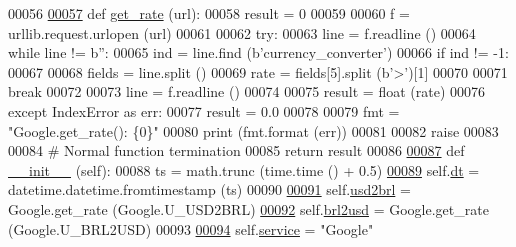 \begin{DoxyCode}
{{00056 
\hypertarget{rates_8py_source.tex_l00057}{}\hyperlink{classrates_1_1_google_afa49252959b89741449dca773f2141b8}{00057}     \textcolor{keyword}{def }\hyperlink{classrates_1_1_google_afa49252959b89741449dca773f2141b8}{get\_rate} (url):
00058         result = 0
00059     
00060         f = urllib.request.urlopen (url)
00061         
00062         \textcolor{keywordflow}{try}:
00063             line = f.readline ()
00064             \textcolor{keywordflow}{while} line != b\textcolor{stringliteral}{''}:
00065                 ind = line.find (b\textcolor{stringliteral}{'currency\_converter'})
00066                 \textcolor{keywordflow}{if} ind != -1:
00067                     
00068                     fields = line.split ()
00069                     rate = fields[5].split (b\textcolor{stringliteral}{'>'})[1]
00070                     
00071                     \textcolor{keywordflow}{break}
00072                     
00073                 line = f.readline ()
00074             
00075             result = float (rate)
00076         \textcolor{keywordflow}{except} IndexError \textcolor{keyword}{as} err:
00077             result = 0.0
00078             
00079             fmt = \textcolor{stringliteral}{"Google.get\_rate(): \{0\}"}
00080             \textcolor{keywordflow}{print} (fmt.format (err))
00081             
00082             \textcolor{keywordflow}{raise}
00083         
00084         \textcolor{comment}{# Normal function termination}
00085         \textcolor{keywordflow}{return} result
00086 
\hypertarget{rates_8py_source.tex_l00087}{}\hyperlink{classrates_1_1_google_a6d9d023db3b4f6f2b585397e3469c396}{00087}     \textcolor{keyword}{def }\hyperlink{classrates_1_1_google_a6d9d023db3b4f6f2b585397e3469c396}{\_\_init\_\_} (self):
00088         ts = math.trunc (time.time () + 0.5)
\hypertarget{rates_8py_source.tex_l00089}{}\hyperlink{classrates_1_1_google_a76574be36237f78780f76bed53e69ab2}{00089}         self.\hyperlink{classrates_1_1_google_a76574be36237f78780f76bed53e69ab2}{dt} = datetime.datetime.fromtimestamp (ts)
00090                 
\hypertarget{rates_8py_source.tex_l00091}{}\hyperlink{classrates_1_1_google_a94c28f6d60d5d6afc075416d7378471c}{00091}         self.\hyperlink{classrates_1_1_google_a94c28f6d60d5d6afc075416d7378471c}{usd2brl} = Google.get\_rate (Google.U\_USD2BRL)
\hypertarget{rates_8py_source.tex_l00092}{}\hyperlink{classrates_1_1_google_a0979ffcb18b8bf3156cc5735c67ca6df}{00092}         self.\hyperlink{classrates_1_1_google_a0979ffcb18b8bf3156cc5735c67ca6df}{brl2usd} = Google.get\_rate (Google.U\_BRL2USD)
00093                 
\hypertarget{rates_8py_source.tex_l00094}{}\hyperlink{classrates_1_1_google_a1da08e36d5007aa5293d048b625a35e9}{00094}         self.\hyperlink{classrates_1_1_google_a1da08e36d5007aa5293d048b625a35e9}{service} = \textcolor{stringliteral}{"Google"}
}}
\end{DoxyCode}
